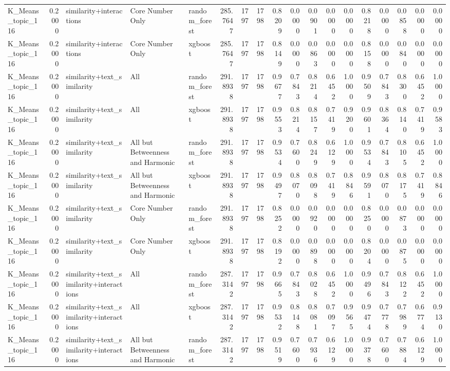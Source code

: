 \begin{tabular}{lrlllrrrrrrrrrrrrr}
K_Means_topic_116 & 0.2000 & similarity+interactions & Core Number Only & random_forest & 285.7647 & 1797 & 1798 & 0.8209 & 0.0000 & 0.0901 & 0.0000 & 0.0000 & 0.8218 & 0.0000 & 0.0858 & 0.0000 & 0.0000 \\
K_Means_topic_116 & 0.2000 & similarity+interactions & Core Number Only & xgboost & 285.7647 & 1797 & 1798 & 0.8149 & 0.0000 & 0.0863 & 0.0000 & 0.0000 & 0.8158 & 0.0000 & 0.0840 & 0.0000 & 0.0000 \\
K_Means_topic_116 & 0.2000 & similarity+text_similarity & All & random_forest & 291.8938 & 1797 & 1798 & 0.9677 & 0.7843 & 0.8214 & 0.6452 & 1.0000 & 0.9509 & 0.7843 & 0.8300 & 0.6452 & 1.0000 \\
K_Means_topic_116 & 0.2000 & similarity+text_similarity & All & xgboost & 291.8938 & 1797 & 1798 & 0.9553 & 0.8214 & 0.8157 & 0.7419 & 0.9200 & 0.9601 & 0.8364 & 0.8140 & 0.7419 & 0.9583 \\
K_Means_topic_116 & 0.2000 & similarity+text_similarity & All but Betweenness and Harmonic & random_forest & 291.8938 & 1797 & 1798 & 0.9534 & 0.7600 & 0.8249 & 0.6129 & 1.0000 & 0.9534 & 0.7843 & 0.8105 & 0.6452 & 1.0000 \\
K_Means_topic_116 & 0.2000 & similarity+text_similarity & All but Betweenness and Harmonic & xgboost & 291.8938 & 1797 & 1798 & 0.9497 & 0.8070 & 0.8098 & 0.7419 & 0.8846 & 0.9591 & 0.8070 & 0.8175 & 0.7419 & 0.8846 \\
K_Means_topic_116 & 0.2000 & similarity+text_similarity & Core Number Only & random_forest & 291.8938 & 1797 & 1798 & 0.8252 & 0.0000 & 0.0920 & 0.0000 & 0.0000 & 0.8250 & 0.0000 & 0.0873 & 0.0000 & 0.0000 \\
K_Means_topic_116 & 0.2000 & similarity+text_similarity & Core Number Only & xgboost & 291.8938 & 1797 & 1798 & 0.8192 & 0.0000 & 0.0898 & 0.0000 & 0.0000 & 0.8204 & 0.0000 & 0.0875 & 0.0000 & 0.0000 \\
K_Means_topic_116 & 0.2000 & similarity+text_similarity+interactions & All & random_forest & 287.3142 & 1797 & 1798 & 0.9665 & 0.7843 & 0.8028 & 0.6452 & 1.0000 & 0.9496 & 0.7843 & 0.8122 & 0.6452 & 1.0000 \\
K_Means_topic_116 & 0.2000 & similarity+text_similarity+interactions & All & xgboost & 287.3142 & 1797 & 1798 & 0.9532 & 0.8148 & 0.8081 & 0.7097 & 0.9565 & 0.9474 & 0.7778 & 0.7989 & 0.6774 & 0.9130 \\
K_Means_topic_116 & 0.2000 & similarity+text_similarity+interactions & All but Betweenness and Harmonic & random_forest & 287.3142 & 1797 & 1798 & 0.9519 & 0.7600 & 0.7936 & 0.6129 & 1.0000 & 0.9378 & 0.7600 & 0.7884 & 0.6129 & 1.0000 \\

\end{tabular}
